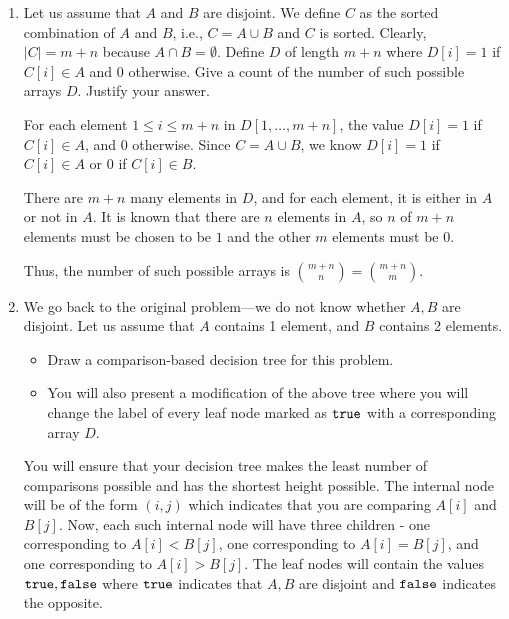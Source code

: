 \begin{enumerate}
	\item Let us assume that $A$ and $B$ are disjoint.
	We define $C$ as the sorted combination of
	$A$ and $B$, i.e., $C=A\cup B$ and $C$ is sorted. Clearly,
	$|C|=m+n$ because $A\cap B=\emptyset$. Define
	$D$ of length $m+n$ where $D[i]=1$ if $C[i]\in A$ and 0
	otherwise. Give a count of the number of such possible
	arrays $D$. Justify your answer. 

\begin{solution}
For each element $1\leq i\leq m+n$ in $D[1,\dots,m+n]$, the value $D[i]=1$ if $C[i]\in A$, and $0$ otherwise. Since $C=A\cup B$, we know $D[i]=1$ if $C[i]\in A$ or $0$ if $C[i]\in B$.

There are $m+n$ many elements in $D$, and for each element, it is either in $A$ or not in $A$. It is known that there are $n$ elements in $A$, so $n$ of $m+n$ elements must be chosen to be $1$ and the other $m$ elements must be $0$.

Thus, the number of such possible arrays is $\binom{m+n}{n}=\binom{m+n}{m}$.

\end{solution}

	\item We go back to the original problem---we do not know whether $A,B$ are disjoint. Let us assume that $A$ contains 1 element, and $B$ contains 2 elements. 
	
	\begin{itemize}
	\item Draw a comparison-based decision tree for this problem.
	\item You will also present a modification of the above tree
	where you will change the label of every leaf node marked as $\mathtt{true}$ 
	with a corresponding array $D$. 
	\end{itemize}
	
	You will ensure that your decision tree makes 
	the least number of comparisons possible and has
	the shortest height possible. The internal 
	node will be of the form $(i,j)$ which 
	indicates that you are comparing $A[i]$ and $B[j]$. 
	Now, each such internal node will have three children - 
	one corresponding to $A[i]<B[j]$, one corresponding to $A[i]=B[j]$,
	and one corresponding to $A[i]>B[j]$. The leaf
	nodes will contain the values $\mathtt{true},\mathtt{false}$
	where $\mathtt{true}$ indicates that $A,B$ are disjoint
	and $\mathtt{false}$ indicates the opposite. 
	
\begin{solution}


\end{solution}
\end{enumerate}
